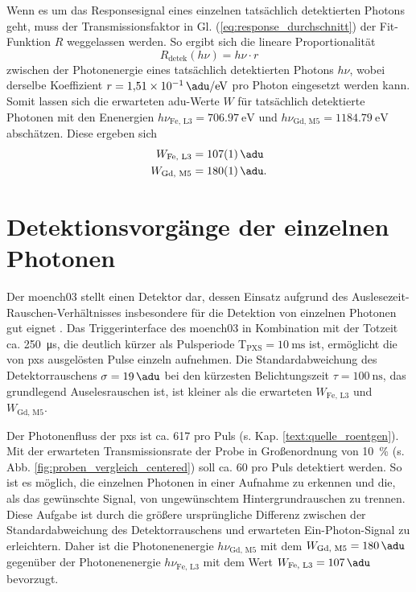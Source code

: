 \noindent
Wenn es um das Responsesignal eines einzelnen tatsächlich detektierten Photons geht, muss der Transmissionsfaktor in Gl. (\ref{eq:response_durchschnitt}) der Fit-Funktion $R$ weggelassen werden. So ergibt sich die lineare Proportionalität
\begin{equation}
    R_\text{detek}(h\nu) = h\nu \cdot r
    \label{eq:adu_to_ev}
\end{equation}
zwischen der Photonenergie eines tatsächlich detektierten Photons $h\nu$, wobei derselbe Koeffizient $r = \SI{1.51e-1}{\adu\per\eV}$ pro Photon eingesetzt werden kann. Somit lassen sich die erwarteten \gls{adu}-Werte $W$ für tatsächlich detektierte Photonen mit den Enenergien $h\nu_{\text{Fe, L3}} = \SI{706.97}{\eV}$ und $h\nu_{\text{Gd, M5}} = \SI{1184.79}{\eV}$ abschätzen. Diese ergeben sich 
\begin{equation}
\begin{split}
     W_{\text{Fe, L3}} &=  \SI{107(1)}{\adu}\\
     W_{\text{Gd, M5}} &=  \SI{180(1)}{\adu}.
\end{split}
\label{eq:auselesewerte_fe_gd}
\end{equation}


\section{Detektionsvorgänge der einzelnen Photonen}
\label{text:single_photon_theorie}
Der \gls{moench03} stellt einen Detektor dar, dessen Einsatz aufgrund des Auslesezeit-Rauschen-Ver\-hält\-nis\-ses insbesondere für die Detektion von einzelnen Photonen gut eignet \cite{bergamaschi_monch_2018}. Das Triggerinterface des \gls{moench03} in Kombination mit der Totzeit ca. \SI{250}{\micro\second}, die deutlich kürzer als Pulsperiode T$_\text{PXS} = \SI{10}{\milli\second}$ ist, ermöglicht die von \gls{pxs} ausgelösten Pulse einzeln aufnehmen. Die Standardabweichung des Detektorrauschens $\sigma = \SI{19}{\adu}$ bei den kürzesten Belichtungszeit $\tau = \SI{100}{\nano\second}$, das grundlegend Auselesrauschen ist, ist kleiner als die erwarteten $W_{\text{Fe, L3}}$ und $W_{\text{Gd, M5}}$.

\noindent
Der Photonenfluss der \gls{pxs} ist ca. \SI{617}{\photons} pro Puls (s. Kap. \ref{text:quelle_roentgen}). Mit der erwarteten Transmissionsrate der Probe in Großenordnung von \SI{10}{\percent} (s. Abb. \ref{fig:proben_vergleich_centered}) soll ca. \SI{60}{\photons} pro Puls detektiert werden. So ist es möglich, die einzelnen Photonen in einer Aufnahme zu erkennen und die, als das gewünschte Signal, von ungewünschtem Hintergrundrauschen zu trennen. Diese Aufgabe ist durch die größere ursprüngliche Differenz zwischen der Standardabweichung des Detektorrauschens und erwarteten Ein-Photon-Signal zu erleichtern. Daher ist die Photonenenergie $h\nu_\text{Gd, M5}$ mit dem $W_{\text{Gd, M5}} = \SI{180}{\adu}$ gegenüber der Photonenenergie $h\nu_\text{Fe, L3}$ mit dem Wert $W_{\text{Fe, L3}} = \SI{107}{\adu}$ bevorzugt.

